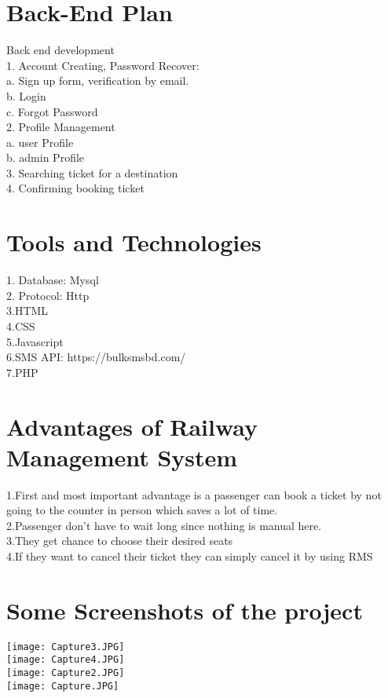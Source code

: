 \documentclass{article}
\begin{document}
\section{Back-End Plan}
Back end development\\
1. Account Creating, Password Recover:\\
a. Sign up form, verification by email.\\
b. Login\\
c. Forgot Password\\
2. Profile Management\\
a. user Profile\\
b. admin Profile\\
3. Searching ticket for a destination\\
4. Confirming booking ticket\\


\section{Tools and Technologies}
1. Database: Mysql\\
2. Protocol: Http\\
3.HTML\\
4.CSS\\
5.Javascript\\
6.SMS API: https://bulksmsbd.com/\\
7.PHP\\
\section{Advantages of Railway Management System}
1.First and most important advantage is a passenger can book a ticket by not going to the counter in person which saves a lot of time.\\
2.Passenger don't have to wait long since nothing is manual here.\\
3.They get chance to choose their desired seats\\
4.If they want to cancel their ticket they can simply cancel it by using RMS \\

\section{Some Screenshots of the project}
\texttt{[image: Capture3.JPG]}\\ \vspace{0.1in}
\texttt{[image: Capture4.JPG]}\\ \vspace{0.1in}
\texttt{[image: Capture2.JPG]}\\ \vspace{0.1in}
\texttt{[image: Capture.JPG]}\\ \vspace{0.1in}
\end{document}
